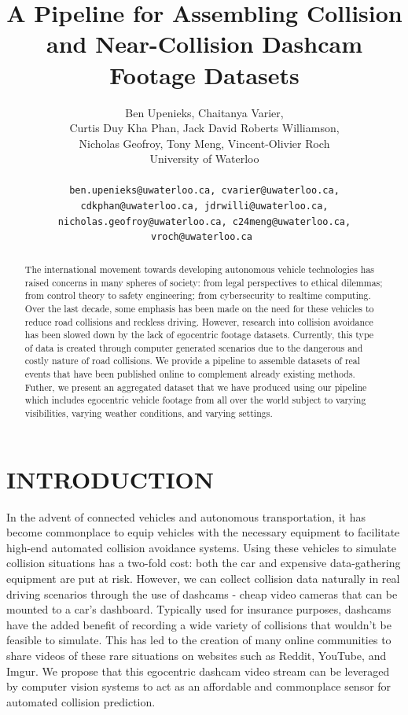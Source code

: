 \documentclass[letterpaper, 10 pt, conference]{IEEEconf}
\title{\LARGE \bf
A Pipeline for Assembling Collision and Near-Collision Dashcam Footage Datasets
}
\author{
         Ben Upenieks, Chaitanya Varier,\\
         Curtis Duy Kha Phan, Jack David Roberts Williamson,\\
         Nicholas Geofroy, Tony Meng, Vincent-Olivier Roch\\
         University of Waterloo\\
         \\
         \tt\small ben.upenieks@uwaterloo.ca, cvarier@uwaterloo.ca,
         \\ \tt\small cdkphan@uwaterloo.ca, jdrwilli@uwaterloo.ca,
         \\ \tt\small nicholas.geofroy@uwaterloo.ca, c24meng@uwaterloo.ca, vroch@uwaterloo.ca
}
\begin{document}
\maketitle
\thispagestyle{empty}
\pagestyle{empty}


\begin{abstract}

The international movement towards developing autonomous vehicle technologies has raised concerns in many spheres of society: from legal perspectives \cite{Pattinson2020} to ethical dilemmas; from control theory to safety engineering; from cybersecurity to realtime computing. Over the
last decade, some emphasis has been made on the need for these vehicles to reduce road collisions and reckless driving. However, research into collision avoidance has been slowed down by the lack of egocentric footage datasets. Currently, this type of data is created through computer generated scenarios \cite{Kim_Lee_Hwang_Suh_2019} due to the dangerous and costly nature of road collisions. We provide a pipeline to assemble datasets of real events that have been published online to complement already existing methods. Futher, we present an aggregated dataset that we have produced using our pipeline which includes egocentric vehicle footage from all over the world subject to varying visibilities, varying weather conditions, and varying settings.

\end{abstract}

\section{INTRODUCTION}

In the advent of connected vehicles and autonomous transportation, it has become commonplace to equip vehicles with the necessary equipment to facilitate high-end automated collision avoidance systems.
Using these vehicles to simulate collision situations has a two-fold cost: both the car and expensive data-gathering equipment are put at risk.
However, we can collect collision data naturally in real driving scenarios through the use of dashcams - cheap video cameras that can be mounted to a car's dashboard.
Typically used for insurance purposes, dashcams have the added benefit of recording a wide variety of collisions that wouldn't be feasible to simulate. 
This has led to the creation of many online communities to share videos of these rare situations on websites such as Reddit, YouTube, and Imgur.
We propose that this egocentric dashcam video stream can be leveraged by computer vision systems to act as an affordable and commonplace sensor for automated collision prediction. 
\end{document}
